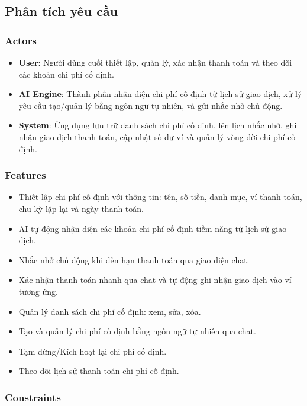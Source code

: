 \subsection{Phân tích yêu cầu}



\subsubsection{Actors}

\begin{itemize}
\item \textbf{User}: Người dùng cuối thiết lập, quản lý, xác nhận thanh toán và theo dõi các khoản chi phí cố định.
\item \textbf{AI Engine}: Thành phần nhận diện chi phí cố định từ lịch sử giao dịch, xử lý yêu cầu tạo/quản lý bằng ngôn ngữ tự nhiên, và gửi nhắc nhở chủ động.
\item \textbf{System}: Ứng dụng lưu trữ danh sách chi phí cố định, lên lịch nhắc nhở, ghi nhận giao dịch thanh toán, cập nhật số dư ví và quản lý vòng đời chi phí cố định.
\end{itemize}
\subsubsection{Features}

\begin{itemize}
\item Thiết lập chi phí cố định với thông tin: tên, số tiền, danh mục, ví thanh toán, chu kỳ lặp lại và ngày thanh toán.
\item AI tự động nhận diện các khoản chi phí cố định tiềm năng từ lịch sử giao dịch.
\item Nhắc nhở chủ động khi đến hạn thanh toán qua giao diện chat.
\item Xác nhận thanh toán nhanh qua chat và tự động ghi nhận giao dịch vào ví tương ứng.
\item Quản lý danh sách chi phí cố định: xem, sửa, xóa.
\item Tạo và quản lý chi phí cố định bằng ngôn ngữ tự nhiên qua chat.
\item Tạm dừng/Kích hoạt lại chi phí cố định.
\item Theo dõi lịch sử thanh toán chi phí cố định.
\end{itemize}
\subsubsection{Constraints}

